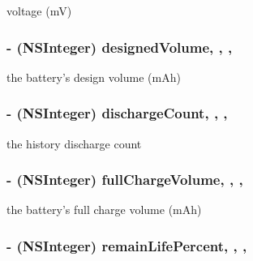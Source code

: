 voltage (m\+V) \hypertarget{interface_d_j_i_battery_a37e3119e928eaac82f3670cacd3b191e}{
\subsubsection[{designed\+Volume}]{\setlength{\rightskip}{0pt plus 5cm}-\/ (N\+S\+Integer) designed\+Volume\hspace{0.3cm}{\ttfamily [read]}, {\ttfamily [write]}, {\ttfamily [nonatomic]}, {\ttfamily [assign]}}}\label{interface_d_j_i_battery_a37e3119e928eaac82f3670cacd3b191e}
the battery's design volume (m\+Ah) \hypertarget{interface_d_j_i_battery_a5f1acd23e4218474087ef29e2b8c3bb3}{
\subsubsection[{discharge\+Count}]{\setlength{\rightskip}{0pt plus 5cm}-\/ (N\+S\+Integer) discharge\+Count\hspace{0.3cm}{\ttfamily [read]}, {\ttfamily [write]}, {\ttfamily [nonatomic]}, {\ttfamily [assign]}}}\label{interface_d_j_i_battery_a5f1acd23e4218474087ef29e2b8c3bb3}
the history discharge count \hypertarget{interface_d_j_i_battery_a87e103436cc4f431bbdc1928cb966326}{
\subsubsection[{full\+Charge\+Volume}]{\setlength{\rightskip}{0pt plus 5cm}-\/ (N\+S\+Integer) full\+Charge\+Volume\hspace{0.3cm}{\ttfamily [read]}, {\ttfamily [write]}, {\ttfamily [nonatomic]}, {\ttfamily [assign]}}}\label{interface_d_j_i_battery_a87e103436cc4f431bbdc1928cb966326}
the battery's full charge volume (m\+Ah) \hypertarget{interface_d_j_i_battery_a254d1b5afd5e99b82f8d18598b840b8f}{
\subsubsection[{remain\+Life\+Percent}]{\setlength{\rightskip}{0pt plus 5cm}-\/ (N\+S\+Integer) remain\+Life\+Percent\hspace{0.3cm}{\ttfamily [read]}, {\ttfamily [write]}, {\ttfamily [nonatomic]}, {\ttfamily [assign]}}}\label{interface_d_j_i_battery_a254d1b5afd5e99b82f8d18598b840b8f}
